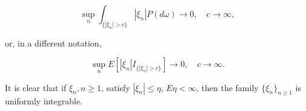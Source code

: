 $$\sup_n \int_{\{|\xi_n| > c\}} |\xi_n| P(d\omega) \to 0, \quad c \to \infty,$$

or, in a different notation,

$$\sup_n E[|\xi_n| I_{\{|\xi_n| > c\}}] \to 0, \quad c \to \infty.$$

It is clear that if $\xi_n, n \geq 1$, satisfy $|\xi_n| \leq \eta$, $E\eta < \infty$, then the family $\{\xi_n\}_{n \geq 1}$ is uniformly integrable.
